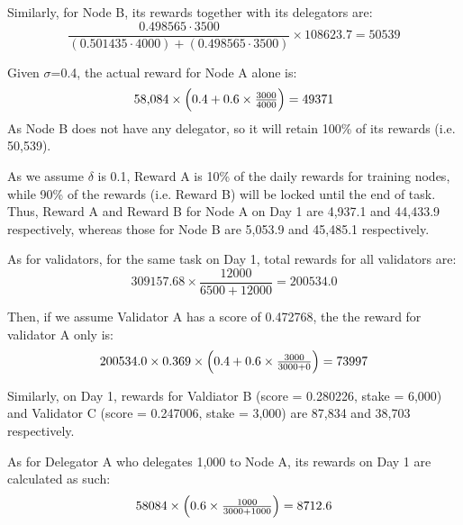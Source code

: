 \documentclass[conference]{IEEEtran}
\begin{document}
Similarly, for Node B, its rewards together with its delegators are:
    $$\frac{0.498565 \cdot 3500}{(0.501435 \cdot 4000) + (0.498565 \cdot 3500)} \times 108623.7  = 50539
$$

Given $\sigma$=0.4, the actual reward for Node A alone is:
    $$58{,}084 \times \Bigl(0.4 + 0.6 \times \tfrac{3000}{4000}\Bigr) = 49371$$
As Node B does not have any delegator, so it will retain 100\% of its rewards (i.e. 50,539).

As we assume $\delta$ is 0.1, Reward A is 10\% of the daily rewards for training nodes, while 90\% of the rewards (i.e. Reward B) will be locked until the end of task.  Thus, Reward A and Reward B for Node A on Day 1 are 4,937.1 and 44,433.9 respectively, whereas those for Node B are 5,053.9 and 45,485.1 respectively.

As for validators, for the same task on Day 1, total rewards for all validators are:
    $$309157.68 \times \frac{12000}{6500 + 12000}= 200534.0$$

Then, if we assume Validator A has a score of 0.472768, the the reward for validator A only is:
    $$200534.0 \times 0.369 \times \Bigl(0.4 + 0.6 \times \tfrac{3000}{3000 + 0}\Bigr)=73997$$

Similarly, on Day 1, rewards for Valdiator B (score = 0.280226, stake = 6,000) and Validator C (score = 0.247006, stake = 3,000) are 87,834 and 38,703 respectively.

As for Delegator A who delegates 1,000 to Node A, its rewards on Day 1 are calculated as such:
    $$58084 \times \Bigl(0.6 \times \tfrac{1000}{3000 + 1000}\Bigr)=8712.6$$
\end{document}
